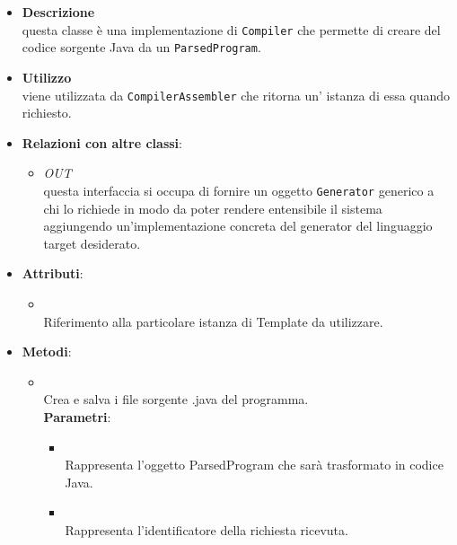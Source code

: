 \begin{itemize}
\item \textbf{Descrizione}\\
questa classe è una implementazione di \texttt{Compiler} che permette di creare del codice sorgente Java da un \texttt{ParsedProgram}.
\item \textbf{Utilizzo}\\
viene utilizzata da \texttt{CompilerAssembler} che ritorna un' istanza di essa quando richiesto.
\item \textbf{Relazioni con altre classi}:
\begin{itemize}
\item \textit{OUT} \hyperref[\nogloxy{swedesigner::server::generator::Generator}]{}\\
questa interfaccia si occupa di fornire un oggetto \texttt{Generator} generico a chi lo richiede in modo da poter rendere entensibile il sistema aggiungendo un'implementazione concreta del generator del linguaggio target desiderato.
\end{itemize}
\item \textbf{Attributi}:
\begin{itemize}
\item {}
\\ Riferimento alla particolare istanza di Template da utilizzare.
\end{itemize}
\item \textbf{Metodi}:
\begin{itemize}
\item {}
\\ Crea e salva i file sorgente .java del programma.
\\ \textbf{Parametri}:
\begin{itemize}
\item {}
\\ Rappresenta l'oggetto ParsedProgram che sarà trasformato in codice Java. 
\item {}
\\ Rappresenta l'identificatore della richiesta ricevuta.
\end{itemize}
\end{itemize}
\end{itemize}
\subsection{}
\label{\nogloxy{swedesigner::server::parser}}
